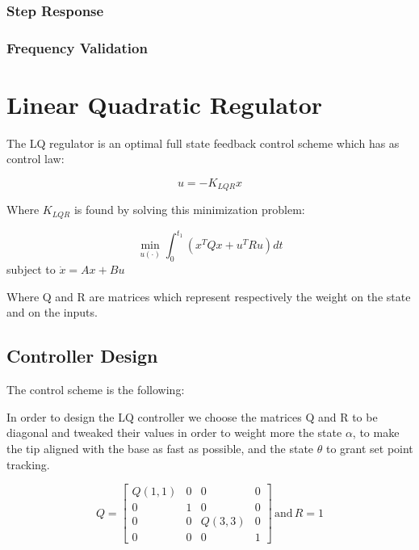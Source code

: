 \subsubsection{Step Response}

\subsubsection{Frequency Validation}


\section{Linear Quadratic Regulator}

The LQ regulator is an optimal full state feedback control scheme which has as control law:

\begin{equation*}
    u = -K_{LQR}x
\end{equation*}

Where $K_{LQR}$ is found by solving this minimization problem:


$$ \min _{u(\cdot)} \int_0^{t_1}\left(x^T Q x+u^T R u\right) d t $$ 
subject to $\dot{x}=A x+B u$ 

Where Q and R are matrices which represent respectively the weight on the state and on the inputs.

\subsection{Controller Design}

The control scheme is the following:


In order to design the LQ controller we choose the matrices Q and R to be diagonal and tweaked their values in order to weight more the state $\alpha$, to make the tip aligned with the base as fast as possible, and the state $\theta$ to grant set point tracking.

\begin{equation*}
Q = 
    \begin{bmatrix}
    Q(1,1) & 0 & 0 & 0 \\
    0 & 1 & 0 & 0 \\
    0 & 0 & Q(3,3) & 0 \\
    0 & 0 & 0 & 1 
\end{bmatrix} \,
\text{and} \, R = 1
\end{equation*} 

